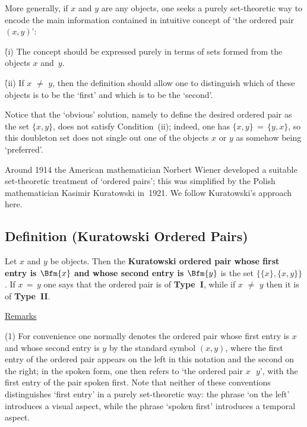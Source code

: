 {        More generally, if $x$ and $y$ are any objects, one seeks a purely set-theoretic way to encode the main information contained in intuitive concept of `the ordered pair $(x,y)$':

\VA

        \h (i) The concept should be expressed purely in terms of sets formed from the objects $x$ and~$y$.

        \h (ii) If $x \,\,{\neq}\,\, y$, then the definition should allow one to distinguish which of these objects is to be the `first' and which is to be the `second'.

\VA

\noindent Notice that the `obvious' solution, namely to define the desired ordered pair as the set $\{x,y\}$, does not satisfy Condition~(ii);
    indeed, one has $\{x,y\} \,=\, \{y,x\}$, so this doubleton set does not single out one of the objects $x$ or $y$ as somehow being `preferred'.

        Around 1914 the American mathematician Norbert Wiener developed a suitable set-theoretic treatment of `ordered pairs';
    this was simplified by the Polish mathematician Kasimir Kuratowski in~1921. We follow Kuratowski's approach here.

\V
\V

        \subsection{\small{{\bf Definition} (Kuratowski Ordered Pairs})}
        \label{DefA12.10}

        Let $x$ and $y$ be objects. Then the {\bf Kuratowski ordered pair whose first entry is $\Bfm{x}$ and whose second entry is $\Bfm{y}$} is the set $\{\{x\},\{x,y\}\}$.
    If $x \,=\, y$ one says that the ordered pair is of {\bf Type~I}, while if $x \,\,{\neq}\,\, y$ then it is of {\bf Type~II}.

\V

        \underline{Remarks}

\V

        (1) For convenience one normally denotes the ordered pair whose first entry is $x$ and whose second entry is $y$ by the standard symbol $(x,y)$,
    where the first entry of the ordered pair appears on the left in this notation and the second on the right;
    in the spoken form, one then refers to `the ordered pair $x$\,~$y$', with the first entry of the pair spoken first.
    Note that neither of these conventions distinguishes `first entry' in a purely set-theoretic way:
    the phrase `on the left' introduces a visual aspect, while the phrase `spoken first' introduces a temporal aspect.

}
